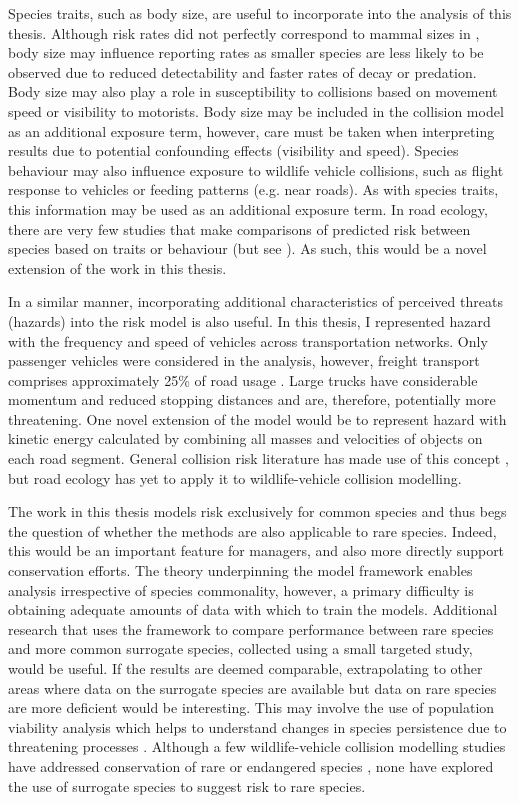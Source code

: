Species traits, such as body size, are useful to incorporate into the analysis of this thesis. Although risk rates did not perfectly correspond to mammal sizes in , body size may influence reporting rates as smaller species are less likely to be observed due to reduced detectability and faster rates of decay or predation. Body size may also play a role in susceptibility to collisions based on movement speed \citep{jaar06} or visibility to motorists. Body size may be included in the collision model as an additional exposure term, however, care must be taken when interpreting results due to potential confounding effects (visibility and speed). Species behaviour may also influence exposure to wildlife vehicle collisions, such as flight response to vehicles \citep{deva14,lee10} or feeding patterns (e.g. near roads). As with species traits, this information may be used as an additional exposure term. In road ecology, there are very few studies that make comparisons of predicted risk between species based on traits or behaviour (but see \cite{litv08}). As such, this would be a novel extension of the work in this thesis. 

In a similar manner, incorporating additional characteristics of perceived threats (hazards) into the risk model is also useful. In this thesis, I represented hazard with the frequency and speed of vehicles across transportation networks. Only passenger vehicles were considered in the analysis, however, freight transport comprises approximately 25\% of road usage \citep{abs11}. Large trucks have considerable momentum and reduced stopping distances and are, therefore, potentially more threatening. One novel extension of the model would be to represent hazard with kinetic energy calculated by combining all masses and velocities of objects on each road segment. General collision risk literature has made use of this concept \citep{aart06}, but road ecology has yet to apply it to wildlife-vehicle collision modelling.

The work in this thesis models risk exclusively for common species and thus begs the question of whether the methods are also applicable to rare species. Indeed, this would be an important feature for managers, and also more directly support conservation efforts. The theory underpinning the model framework enables analysis irrespective of species commonality, however, a primary difficulty is obtaining adequate amounts of data with which to train the models. Additional research that uses the framework to compare performance between rare species and more common surrogate species, collected using a small targeted study, would be useful. If the results are deemed comparable, extrapolating to other areas where data on the surrogate species are available but data on rare species are more deficient would be interesting. This may involve the use of population viability analysis which helps to understand changes in species persistence due to threatening processes \citep{rhod14}. Although a few wildlife-vehicle collision modelling studies have addressed conservation of rare or endangered species \citep{dwye16}, none have explored the use of surrogate species to suggest risk to rare species.

